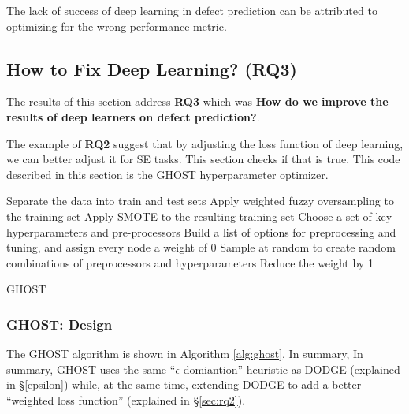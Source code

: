 \documentclass[10pt,compsoc,twocolumn]{IEEEtran}
\begin{document}
\begin{blockquote}
    \noindent
    The  lack of success  of  deep  learning  in  defect prediction  can  be  attributed  to  optimizing  for  the wrong performance metric.
\end{blockquote}


\subsection{  How to Fix Deep Learning? {\bf (RQ3)}}
\label{sec:rq3}

The results of this section address   {\bf RQ3} which was 
{\bf How do we improve the results of deep learners on defect prediction?}.

The   example of  {\bf RQ2} suggest that by adjusting the loss function of deep learning,
we can better adjust it for SE tasks. This section checks if that is true. This code described in this section is the GHOST hyperparameter optimizer.

\begin{algorithm}[!b]
\footnotesize
    \SetAlgoLined
    Separate the data into train and test sets\;
    Apply weighted fuzzy oversampling to the training set\;
    Apply SMOTE to the resulting training set\;
    Choose a set of key hyperparameters and pre-processors\;
    Build a list of options for preprocessing and tuning, and assign every node a weight of 0\;
    Sample at random to create random combinations of preprocessors and hyperparameters\;
     {
        Reduce the weight by 1\;
    }
    \KwRet{$\theta^*$}
    \caption{GHOST}
    \label{alg:ghost}
\end{algorithm}

\subsubsection{GHOST: Design}
The GHOST algorithm is shown in Algorithm \ref{alg:ghost}. In summary,  
In summary, GHOST uses the same ``$\epsilon$-domiantion'' heuristic as DODGE (explained in \S\ref{epsilon}) while, at the same time, extending DODGE to add a better ``weighted loss function'' (explained in \S\ref{sec:rq2}). 
\end{document}
